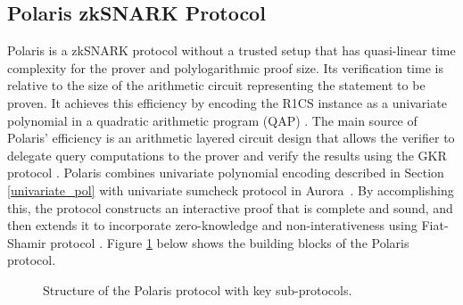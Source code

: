 \subsection{Polaris zkSNARK Protocol}


Polaris \cite{Polaris} is a zkSNARK protocol without a trusted setup that has quasi-linear time complexity for the prover and polylogarithmic proof size. Its verification time is relative to the size of the arithmetic circuit representing the statement to be proven. It achieves this efficiency by encoding the R1CS instance as a univariate polynomial in a quadratic arithmetic program (QAP) \cite{GGPR13}. The main source of Polaris' efficiency is an arithmetic layered circuit design that allows the verifier to delegate query computations to the prover and verify the results using the GKR protocol \cite{GKR2008}. 
Polaris combines univariate polynomial encoding described in Section \ref{univariate_pol} with univariate sumcheck protocol in Aurora~\cite{Aurora2019}.
By accomplishing this, the protocol constructs an interactive proof that is complete and sound, and then extends it to incorporate zero-knowledge and non-interativeness using Fiat-Shamir protocol \cite{Fiat1987}. Figure \ref{fig:polaris-blocks} below shows the building blocks of the Polaris protocol.

\begin{figure}[h]
	\centering
	
	\caption{
		Structure of the Polaris protocol with key sub-protocols. }
	\label{fig:polaris-blocks}
\end{figure}


